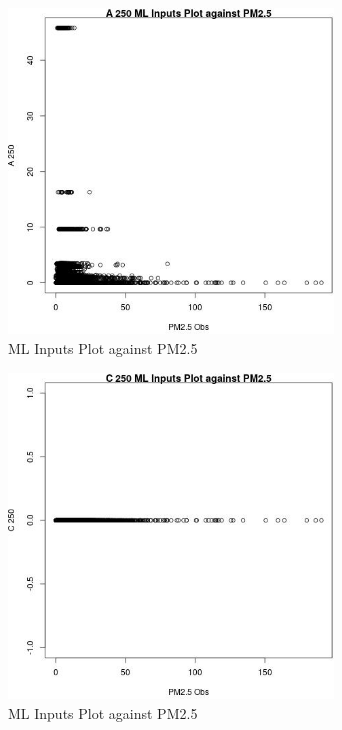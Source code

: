 \begin{figure} 
\centering  
\includegraphics[width=0.77\textwidth]{Code_Outputs/Report_ML_input_PM25_Step4_part_e_de_duplicated_aves_A_250vPM25_Obs.jpg} 
\caption{\label{fig:Report_ML_input_PM25_Step4_part_e_de_duplicated_avesA_250vPM25_Obs}ML Inputs Plot against PM2.5} 
\end{figure} 
 

\begin{figure} 
\centering  
\includegraphics[width=0.77\textwidth]{Code_Outputs/Report_ML_input_PM25_Step4_part_e_de_duplicated_aves_C_250vPM25_Obs.jpg} 
\caption{\label{fig:Report_ML_input_PM25_Step4_part_e_de_duplicated_avesC_250vPM25_Obs}ML Inputs Plot against PM2.5} 
\end{figure} 
 


